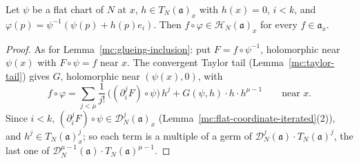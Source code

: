 \begin{lemma}
\label{mc:glueing-inclusion-along}
\leanok
Let \(\psi\) be a flat chart of \(N\) at \(x\), \(h\in T_N(\mathfrak a)_x\) with \(h(x)=0\), \(i<k\), and \(\varphi(p)=\psi^{-1}(\psi(p)+h(p)e_i)\). Then \(f\circ\varphi\in\mathcal H_N(\mathfrak a)_x\)
for every \(f\in\mathfrak a_x\).
\end{lemma}
\begin{proof}
\leanok
As for Lemma~\ref{mc:glueing-inclusion}: put \(F=f\circ\psi^{-1}\), holomorphic near \(\psi(x)\) with \(F\circ\psi=f\) near \(x\). The convergent Taylor tail
(Lemma~\ref{mc:taylor-tail}) gives \(G\), holomorphic near \((\psi(x),0)\), with
\[
 f\circ\varphi=\sum_{j<\mu}\frac1{j!}\,\bigl((\partial_i^jF)\circ\psi\bigr)\,h^j+G(\psi,h)\cdot h\cdot h^{\mu-1}\qquad\text{near }x.
\]
Since \(i<k\), \((\partial_i^jF)\circ\psi\in\mathcal D_N^j(\mathfrak a)_x\) (Lemma~\ref{mc:flat-coordinate-iterated}(2)), and \(h^j\in T_N(\mathfrak a)^j_x\); so each term is a multiple of a germ
of \(\mathcal D_N^j(\mathfrak a)\cdot T_N(\mathfrak a)^j\), the last one of \(\mathcal D_N^{\mu-1}(\mathfrak a)\cdot T_N(\mathfrak a)^{\mu-1}\).
\end{proof}

